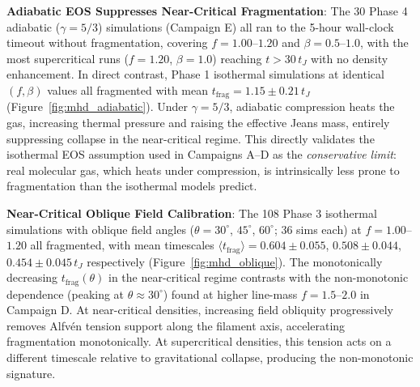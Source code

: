 \documentclass[usenatbib]{rasti}
\begin{document}
\textbf{Adiabatic EOS Suppresses Near-Critical Fragmentation}: The 30 Phase 4 adiabatic
($\gamma = 5/3$) simulations (Campaign E) all ran to the 5-hour wall-clock timeout without
fragmentation, covering $f = 1.00$--$1.20$ and $\beta = 0.5$--$1.0$, with the most
supercritical runs ($f = 1.20$, $\beta = 1.0$) reaching $t > 30\,t_J$ with no density
enhancement. In direct contrast, Phase 1 isothermal simulations at identical $(f, \beta)$
values all fragmented with mean $t_\mathrm{frag} = 1.15 \pm 0.21\,t_J$
(Figure~\ref{fig:mhd_adiabatic}). Under $\gamma = 5/3$, adiabatic compression heats the
gas, increasing thermal pressure and raising the effective Jeans mass, entirely suppressing
collapse in the near-critical regime. This directly validates the isothermal EOS assumption
used in Campaigns A--D as the \emph{conservative limit}: real molecular gas, which heats
under compression, is intrinsically less prone to fragmentation than the isothermal models
predict.

\textbf{Near-Critical Oblique Field Calibration}: The 108 Phase 3 isothermal simulations
with oblique field angles ($\theta = 30^\circ$, $45^\circ$, $60^\circ$; 36 sims each) at
$f = 1.00$--$1.20$ all fragmented, with mean timescales $\langle t_\mathrm{frag} \rangle =
0.604 \pm 0.055$, $0.508 \pm 0.044$, $0.454 \pm 0.045\,t_J$ respectively
(Figure~\ref{fig:mhd_oblique}). The monotonically decreasing $t_\mathrm{frag}(\theta)$
in the near-critical regime contrasts with the non-monotonic dependence (peaking at $\theta
\approx 30^\circ$) found at higher line-mass $f = 1.5$--$2.0$ in Campaign D. At near-critical
densities, increasing field obliquity progressively removes Alfv\'{e}n tension support along
the filament axis, accelerating fragmentation monotonically. At supercritical densities, this
tension acts on a different timescale relative to gravitational collapse, producing the
non-monotonic signature.
\end{document}
